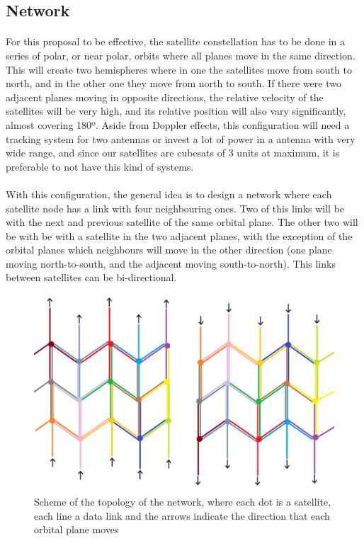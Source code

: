 \subsection{Network}

\paragraph{}For this proposal to be effective, the satellite constellation has to be done in a series of polar, or near polar, orbits where all planes move in the same direction. This will create two hemispheres where in one the satellites move from south to north, and in the other one they move from north to south. If there were two adjacent planes moving in opposite directions, the relative velocity of the satellites will be very high, and its relative position will also vary significantly, almost covering 180º. Aside from Doppler effects, this configuration will need a tracking system for two antennas or invest a lot of power in a antenna with very wide range, and since our satellites are cubesats of 3 units at maximum, it is preferable to not have this kind of systems.

\paragraph{}With this configuration, the general idea is to design a network where each satellite node has a link with four neighbouring ones. Two of this links will be with the next and previous satellite of the same orbital plane. The other two will be with be with a satellite in the two adjacent planes, with the exception of the orbital planes which neighbours will move in the other direction (one plane moving north-to-south, and the adjacent moving south-to-north). This links between satellites can be bi-directional.

\begin{figure}[H]
\centering
\includegraphics[scale=0.5]{./parts/img_jm/network}
\caption[Scheme of the topology]{Scheme of the topology of the network, where each dot is a satellite, each line a data link and the arrows indicate the direction that each orbital plane moves}
\label{Scheme of the topology}
\end{figure}


